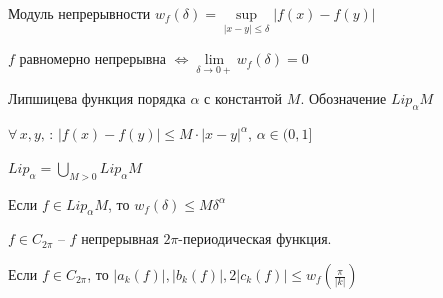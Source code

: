 \begin{definition}
    Модуль непрерывности $w_f (\delta) = \sup\limits_{|x - y| \leqslant \delta} |f(x) - f(y)|$

    \begin{remark}
        $f$ равномерно непрерывна $\Longleftrightarrow \lim\limits_{\delta \to 0+} w_f (\delta) = 0$
    \end{remark}
\end{definition}

\begin{definition}
    Липшицева функция порядка $\alpha$ с константой $M$. Обозначение $Lip_\alpha M$

    $\forall \, x, y, \, : \, |f(x) - f(y)| \leqslant M \cdot |x - y|^\alpha$, $\alpha \in (0, 1]$
\end{definition}

\begin{definition}
    $Lip_\alpha = \bigcup\limits_{M > 0} Lip_\alpha M$
\end{definition}

\begin{remark}
    Если $f \in Lip_\alpha M$, то $w_f (\delta) \leqslant M \delta^\alpha$
\end{remark}


\begin{definition}
    $f \in C_{2\pi}$ -- $f$ непрерывная $2\pi$-периодическая функция.
\end{definition}

\begin{theorem}
    Если $f \in C_{2\pi}$, то $|a_k (f)|, |b_k (f)|, 2|c_k (f)| \leqslant w_f (\frac{\pi}{|k|})$
\end{theorem}

